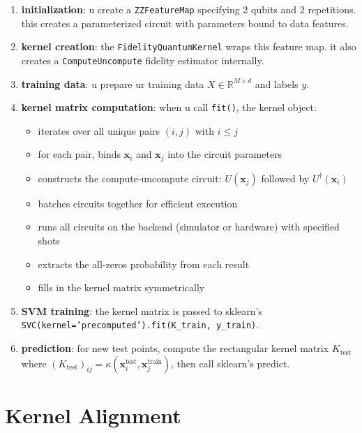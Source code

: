 \documentclass[11pt,a4paper]{article}
\theoremstyle{definition}
\theoremstyle{remark}
\begin{document}
\begin{enumerate}[leftmargin=*]
    \item \textbf{initialization}: u create a \texttt{ZZFeatureMap} specifying 2 qubits and 2 repetitions. this creates a parameterized circuit with parameters bound to data features.

    \item \textbf{kernel creation}: the \texttt{FidelityQuantumKernel} wraps this feature map. it also creates a \texttt{ComputeUncompute} fidelity estimator internally.

    \item \textbf{training data}: u prepare ur training data $X \in \mathbb{R}^{M \times d}$ and labels $y$.

    \item \textbf{kernel matrix computation}: when u call \texttt{fit()}, the kernel object:
    \begin{itemize}[leftmargin=*]
        \item iterates over all unique pairs $(i, j)$ with $i \leq j$
        \item for each pair, binds $\mathbf{x}_i$ and $\mathbf{x}_j$ into the circuit parameters
        \item constructs the compute-uncompute circuit: $U(\mathbf{x}_j)$ followed by $U^\dagger(\mathbf{x}_i)$
        \item batches circuits together for efficient execution
        \item runs all circuits on the backend (simulator or hardware) with specified shots
        \item extracts the all-zeros probability from each result
        \item fills in the kernel matrix symmetrically
    \end{itemize}

    \item \textbf{SVM training}: the kernel matrix is passed to sklearn's \texttt{SVC(kernel='precomputed').fit(K\_train, y\_train)}.

    \item \textbf{prediction}: for new test points, compute the rectangular kernel matrix $K_{\text{test}}$ where $(K_{\text{test}})_{ij} = \kappa(\mathbf{x}_i^{\text{test}}, \mathbf{x}_j^{\text{train}})$, then call sklearn's predict.
\end{enumerate}

\section{Kernel Alignment}
\end{document}
